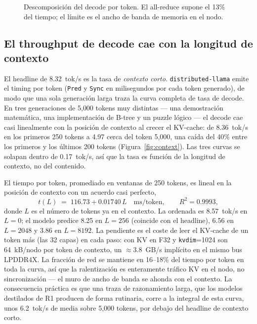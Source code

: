 \documentclass[10pt,a4paper]{article}
\begin{document}
\begin{figure}[H]
\centering
{}
\caption{Descomposición del decode por token. El all-reduce supone el 13\% del tiempo; el límite es el ancho de banda de memoria en el nodo.}
\label{fig:bottleneck}
\end{figure}

\subsection{El throughput de decode cae con la longitud de contexto}
\label{sec:context}
El headline de 8.32~tok/s es la tasa de \emph{contexto corto}. \texttt{distributed-llama} emite el timing por token (\texttt{Pred} y \texttt{Sync} en milisegundos por cada token generado), de modo que una sola generación larga traza la curva completa de tasa de decode. En tres generaciones de 5{,}000 tokens muy distintas --- una demostración matemática, una implementación de B-tree y un puzzle lógico --- el decode cae casi linealmente con la posición de contexto al crecer el KV-cache: de 8.36~tok/s en los primeros 250 tokens a 4.97 cerca del token 5{,}000, una caída del 40\% entre los primeros y los últimos 200 tokens (Figura~\ref{fig:context}). Las tres curvas se solapan dentro de 0.17~tok/s, así que la tasa es función de la longitud de contexto, no del contenido.

El tiempo por token, promediado en ventanas de 250 tokens, es lineal en la posición de contexto con un acuerdo casi perfecto,
\[
  t(L) \;=\; 116.73 + 0.01740\,L \quad\text{ms/token},\qquad R^2 = 0.9993,
\]
donde $L$ es el número de tokens ya en el contexto. La ordenada es 8.57~tok/s en $L{=}0$; el modelo predice 8.25 en $L{=}256$ (coincide con el headline), 6.56 en $L{=}2048$ y 3.86 en $L{=}8192$. La pendiente es el coste de leer el KV-cache de un token más (las 32 capas) en cada paso: con KV en F32 y \texttt{kvdim}=1024 son 64~kB/nodo por token de contexto, un $\approx$3.8~GB/s implícito en el mismo bus LPDDR4X. La fracción de red se mantiene en 16--18\% del tiempo por token en toda la curva, así que la ralentización es enteramente tráfico KV en el nodo, no sincronización --- el muro de ancho de banda se ahonda con el contexto. La consecuencia práctica es que una traza de razonamiento larga, que los modelos destilados de R1 producen de forma rutinaria, corre a la integral de esta curva, unos 6.2~tok/s de media sobre 5{,}000 tokens, por debajo del headline de contexto corto.
\end{document}
